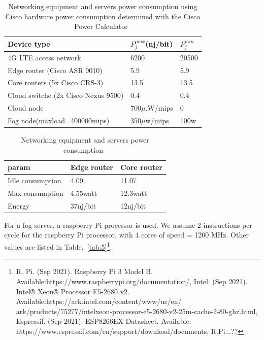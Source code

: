 \documentclass[twocolumn]{article}
\begin{document}
\begin{table}[tb]
\setlength\tabcolsep{0pt}
\scriptsize\centering
\caption {Networking equipment and servers power consumption using Cisco hardware power consumption determined with the Cisco Power Calculator~\cite{wiesner2021leaf}}\label{tab:2}
\smallskip
\begin{tabular*}{8cm}{|p{4cm}p{2cm}p{2cm}|}
\hline
Device type&$P^{max}_{j}$(nj/bit)&$P^{min}_{j}$\\
\hline
    4G LTE access network&6200&20500\\
    Edge router (Cisco ASR 9010)&5.9&5.9\\
   	Core routers (5x Cisco CRS-3)&13.5&13.5\\
   	Cloud switche (2x Cisco Nexus 9500)&0.4&0.4\\
   	Cloud node&700$\mu$.W/mips&0\\
   	Fog node(maxload=400000mips)&350$\mu$w/mips&100w\\
\hline
\end{tabular*}
\end{table}

\begin{table}[thb]
\setlength\tabcolsep{0pt}
\scriptsize\centering
\caption {Networking equipment and servers power consumption~\cite{jalali2016fog}}\label{tab:4}
\smallskip
\begin{tabular*}{7cm}{|p{3cm}p{2cm}p{2cm}|}
\hline
param&Edge router&Core router\\
\hline
   Idle consumption&4.09&11.07\\
   Max consumption&4.55watt&12.3watt\\
   Energy&37nj/bit&12nj/bit\\
\hline
\end{tabular*}
\end{table}
\par For a fog server, a raspberry Pi processor is used. We assume 2 instructions per cycle for the raspberry Pi processor, with 4 cores of speed = 1200 MHz\cite{bekaroo2016power}. Other values are listed in Table.~\ref{tab:5}\footnote{R. Pi. (Sep 2021). Raspberry Pi 3 Model B. Available:https://www.raspberrypi.org/documentation/, Intel. (Sep 2021). Intel® Xeon® Processor E5-2680 v2. Available:https://ark.intel.com/content/www/us/en/ ark/products/75277/intelxeon-processor-e5-2680-v2-25m-cache-2-80-ghz.html, Espressif. (Sep 2021). ESP8266EX Datasheet. Available: https://www.espressif.com/en/support/download/documents, R.Pi...??}.
\end{document}
